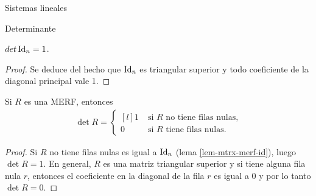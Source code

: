 \begin{chapter}{Sistemas lineales}
\begin{section}{Determinante}
    \begin{corolario}
        $det \operatorname{Id}_n = 1$.
    \end{corolario}
    \begin{proof}
        Se deduce del hecho que $\operatorname{Id}_n$  es triangular superior y todo coeficiente de la diagonal principal vale 1.
    \end{proof}
    
    \begin{corolario}\label{cor-det-merf}
        Si $R$ es una MERF, entonces 
        \begin{align*}
        \det R = \left\{ \begin{matrix*}[l]
        1 \;&\text{si $R$ no tiene filas nulas,}\\
        0&\text{si $R$ tiene filas nulas.}
        \end{matrix*}\right.  
        \end{align*}
    \end{corolario}
    \begin{proof}
        Si $R$ no tiene filas nulas es igual a $\operatorname{Id}_n$ (lema \ref{lem-mtrx-merf-id}), luego $\det R = 1$. En general, $R$ es una matriz triangular superior y si tiene alguna fila nula $r$, entonces el coeficiente en la diagonal de la fila $r$ es igual a $0$ y por lo tanto 	$\det R = 0$.
    \end{proof}


\end{section}
\end{chapter}
